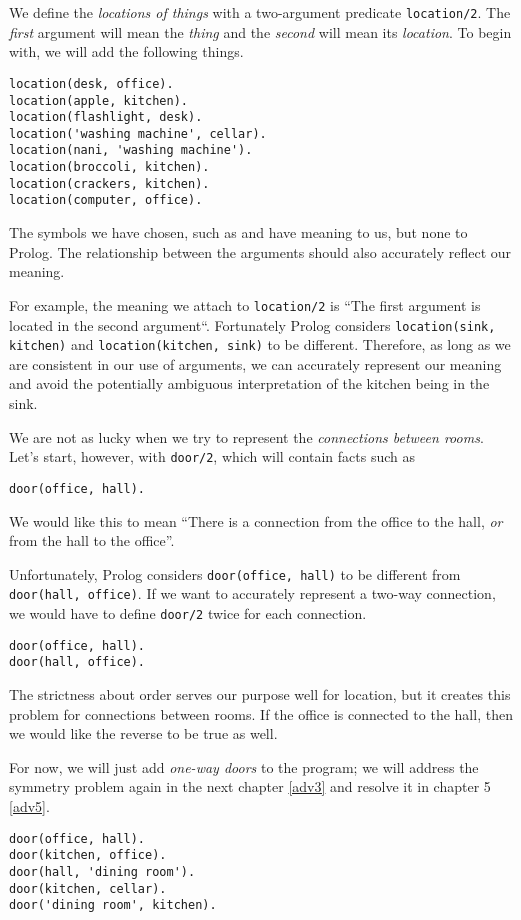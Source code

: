We define the \emph{locations of things} with a two-argument predicate
\verb'location/2'. The \emph{first} argument will mean the \emph{thing} and the
\emph{second} will mean its \emph{location}. To begin with, we will add the
following things.
\begin{verbatim}
location(desk, office).
location(apple, kitchen).
location(flashlight, desk).
location('washing machine', cellar).
location(nani, 'washing machine').
location(broccoli, kitchen).
location(crackers, kitchen).
location(computer, office).
\end{verbatim}

The symbols we have chosen, such as  and  have meaning to
us, but none to Prolog. The relationship between the arguments should also
accurately reflect our meaning.

For example, the meaning we attach to \verb'location/2' is ``The first argument
is located in the second argument``. Fortunately Prolog considers
\verb'location(sink, kitchen)' and \verb'location(kitchen, sink)' to be
different. Therefore, as long as we are consistent in our use of arguments, we
can accurately represent our meaning and avoid the potentially ambiguous
interpretation of the kitchen being in the sink.

We are not as lucky when we try to represent the \emph{connections between
rooms}. Let's start, however, with \verb'door/2', which will contain facts such
as
\begin{verbatim}
door(office, hall).
\end{verbatim}

We would like this to mean ``There is a connection from the office to the hall,
\emph{or} from the hall to the office''.

Unfortunately, Prolog considers \verb'door(office, hall)' to be different from
\verb'door(hall, office)'. If we want to accurately represent a two-way
connection, we would have to define \verb'door/2' twice for each
connection.
\begin{verbatim}
door(office, hall).
door(hall, office).
\end{verbatim}
The strictness about order serves our purpose well for location, but it creates
this problem for connections between rooms. If the office is connected to the
hall, then we would like the reverse to be true as well.

For now, we will just add \emph{one-way doors} to the program; we will address
the symmetry problem again in the next chapter \ref{adv3} and resolve it in
chapter 5 \ref{adv5}.
\begin{verbatim}
door(office, hall).
door(kitchen, office).
door(hall, 'dining room').
door(kitchen, cellar).
door('dining room', kitchen).
\end{verbatim}

